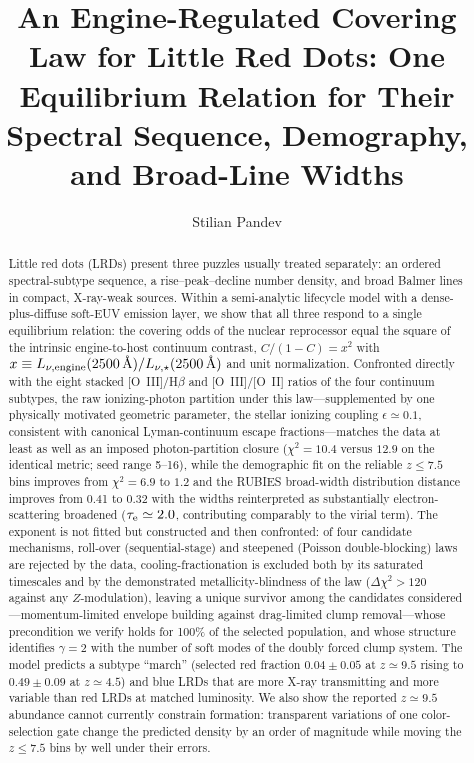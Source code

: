 \documentclass[twocolumn]{aastex631}
\begin{document}
\title{An Engine-Regulated Covering Law for Little Red Dots: One Equilibrium
Relation for Their Spectral Sequence, Demography, and Broad-Line Widths}

\author[0009-0005-8153-071X]{Stilian Pandev}


\begin{abstract}
Little red dots (LRDs) present three puzzles usually treated separately: an
ordered spectral-subtype sequence, a rise--peak--decline number density,
and broad Balmer lines in compact, X-ray-weak sources. Within a
semi-analytic lifecycle model with a dense-plus-diffuse soft-EUV emission
layer, we show that all three respond to a single equilibrium relation: the
covering odds of the nuclear reprocessor equal the square of the intrinsic
engine-to-host continuum contrast, $C/(1-C)=x^{2}$ with $x\equiv
L_{\nu,\rm engine}(2500\,\text{\AA})/L_{\nu,\star}(2500\,\text{\AA})$ and
unit normalization. Confronted directly with the eight stacked
[O~III]/H$\beta$ and [O~III]/[O~II] ratios of the four continuum subtypes,
the raw ionizing-photon partition under this law---supplemented by one
physically motivated geometric parameter, the stellar ionizing coupling
$\epsilon\simeq0.1$, consistent with canonical Lyman-continuum escape
fractions---matches the data at least as well as an imposed
photon-partition closure ($\chi^{2}=10.4$ versus $12.9$ on the identical
metric; seed range 5--16), while the demographic fit on the reliable
$z\le7.5$ bins improves from $\chi^{2}=6.9$ to $1.2$ and the RUBIES
broad-width distribution distance improves from 0.41 to 0.32 with the
widths reinterpreted as substantially electron-scattering broadened
($\tau_{\rm e}\simeq2.0$, contributing comparably to the virial term). The exponent is not fitted but constructed and
then confronted: of four candidate mechanisms, roll-over (sequential-stage)
and steepened (Poisson double-blocking) laws are rejected by the data,
cooling-fractionation is excluded both by its saturated timescales and by
the demonstrated metallicity-blindness of the law
($\Delta\chi^{2}>120$ against any $Z$-modulation), leaving a unique
survivor among the candidates considered---momentum-limited envelope
building against drag-limited clump removal---whose precondition we
verify holds for 100\% of the selected population, and whose structure
identifies $\gamma=2$ with the number of soft modes of the doubly forced
clump system. The model predicts a subtype
``march'' (selected red fraction $0.04\pm0.05$ at $z\simeq9.5$ rising to
$0.49\pm0.09$ at $z\simeq4.5$) and blue LRDs that are more X-ray
transmitting and more variable than red LRDs at matched luminosity. We
also show the reported $z\simeq9.5$ abundance cannot currently constrain
formation: transparent variations of one color-selection gate change the
predicted density by an order of magnitude while moving the $z\le7.5$ bins
by well under their errors.
\end{abstract}
\end{document}
